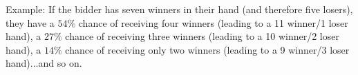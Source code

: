 \documentclass[11pt]{article}
\begin{document}
Example: If the bidder has seven winners in their hand (and therefore five losers), they have a $54\%$ chance of receiving four winners (leading to a 11 winner/1 loser hand), a $27\%$ chance of receiving three winners (leading to a 10 winner/2 loser hand), a $14\%$ chance of receiving only two winners (leading to a 9 winner/3 loser hand)...and so on.  
\end{document}
